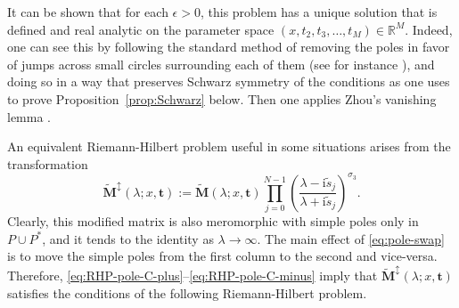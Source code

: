 \documentclass[12pt]{amsart}
\numberwithin{equation}{section}
\newcommand{\ii}{\mathrm{i}}
\newcommand{\SP}{\lambda}
\begin{document}
It can be shown that for each $\epsilon>0$, this problem has a unique solution that is defined and real analytic on the parameter space $(x,t_2,t_3,\dots,t_M)\in\mathbb{R}^M$.  Indeed, one can see this by following the standard method of removing the poles in favor of jumps across small circles surrounding each of them (see for instance \cite{BorgheseJM18}), and doing so in a way that preserves Schwarz symmetry of the conditions as one uses to prove Proposition~\ref{prop:Schwarz} below.  Then one applies Zhou's vanishing lemma \cite{Zhou89}. 

An equivalent Riemann-Hilbert problem useful in some situations arises from the transformation
\begin{equation}
\widetilde{\mathbf{M}}^\updownarrow(\SP;x,\mathbf{t}):=\widetilde{\mathbf{M}}(\SP;x,\mathbf{t})\prod_{j=0}^{N-1}\left(\frac{\SP-\ii\widetilde{s}_j}{\SP+\ii\widetilde{s}_j}\right)^{\sigma_3}.
\label{eq:pole-swap}
\end{equation}
Clearly, this modified matrix is also meromorphic with simple poles only in $P\cup P^*$, and it tends to the identity as $\SP\to\infty$.  
The main effect of \eqref{eq:pole-swap} is to move the simple poles from the first column to the second and vice-versa.  Therefore, \eqref{eq:RHP-pole-C-plus}--\eqref{eq:RHP-pole-C-minus} imply that
$\widetilde{\mathbf{M}}^\updownarrow(\SP;x,\mathbf{t})$ satisfies the conditions of the following Riemann-Hilbert problem.
\end{document}

